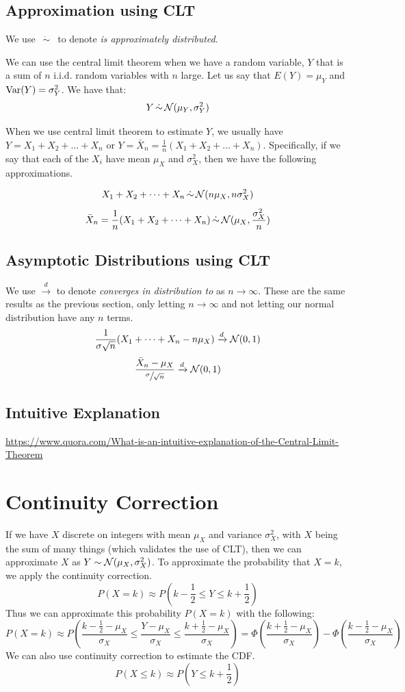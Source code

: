 \documentclass[11pt]{article}
\begin{document}
\subsection*{Approximation using CLT}
We use $\dot{\,\sim\,}$ to denote \emph{is approximately distributed}. {We can use the central limit theorem when we have a random variable, $Y$ that is a sum of $n$ i.i.d. random variables with $n$ large. Let us say that $E(Y) = \mu_Y$ and $\textrm{Var}(Y) = \sigma^2_Y$. We have that:
\[Y \dot{\,\sim\,} \mathcal{N}(\mu_Y, \sigma^2_Y)\]

When we use central limit theorem to estimate $Y$, we usually have $Y = X_1 + X_2 + \dots + X_n$ or $Y = \bar{X}_n= \frac{1}{n}(X_1 + X_2 + \dots + X_n)$. Specifically, if we say that each of the $X_i$ have mean $\mu_X$ and $\sigma^2_X$, then we have the following approximations.

\[ X_1 + X_2 + \dots + X_n \dot{\,\sim\,} \mathcal{N}(n\mu_X, n\sigma^2_X) \]
\[ \bar{X}_n = \frac{1}{n}(X_1 + X_2 + \dots + X_n) \dot{\,\sim\,} \mathcal{N}(\mu_X, \frac{\sigma^2_X}{n}) \]


\subsection*{Asymptotic Distributions using CLT}

We use $\xrightarrow{d}$ to denote \emph{converges in distribution to} as $n \longrightarrow \infty$. These are the same results as the previous section, only letting $n \longrightarrow \infty$ and not letting our normal distribution have any $n$ terms.
\[\frac{1}{\sigma\sqrt{n}} (X_1 + \dots + X_n - n\mu_X) \xrightarrow{d} \mathcal{N}(0, 1)\]
\[\frac{\bar{X}_n - \mu_X}{\sfrac{\sigma}{\sqrt{n}}} \xrightarrow{d} \mathcal{N}(0, 1)\]

\subsection*{Intuitive Explanation}
\url{https://www.quora.com/What-is-an-intuitive-explanation-of-the-Central-Limit-Theorem}

\section*{Continuity Correction}
If we have $X$ discrete on integers with mean $\mu_X$ and variance $\sigma^2_X$, with $X$ being the sum of many things (which validates the use of CLT), then we can approximate $X$ as $Y \sim \mathcal{N}(\mu_X, \sigma^2_X)$. To approximate the probability that $X = k$, we apply the continuity correction.
\[P(X = k) \approx P( k - \frac{1}{2} \leq Y \leq k + \frac{1}{2})\]
Thus we can approximate this probability $P(X = k)$ with the following:
\[P(X = k) \approx P\left( \frac{k - \frac{1}{2} - \mu_X}{\sigma_X} \leq \frac{Y - \mu_X}{\sigma_X} \leq \frac{k + \frac{1}{2} - \mu_X}{\sigma_X}\right) = \Phi\left(\frac{k + \frac{1}{2} - \mu_X}{\sigma_X} \right) - \Phi\left( \frac{k - \frac{1}{2} - \mu_X}{\sigma_X} \right)\]
We can also use continuity correction to estimate the CDF.
\[P(X \leq k) \approx P\left(Y \leq k + \frac{1}{2}\right)\]



}
\end{document}
